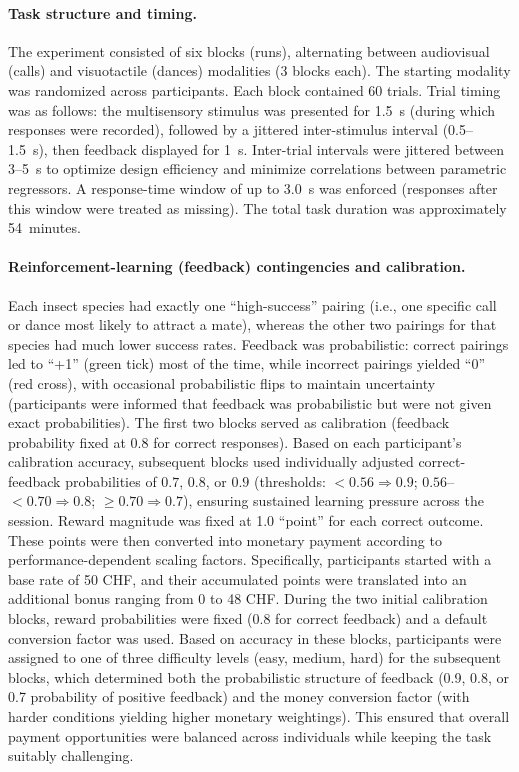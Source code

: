 \documentclass{article}
\begin{document}
\paragraph{Task structure and timing.}
The experiment consisted of six blocks (runs), alternating between audiovisual (calls) and visuotactile (dances) modalities (3 blocks each). The starting modality was randomized across participants. Each block contained 60 trials. Trial timing was as follows: the multisensory stimulus was presented for 1.5~s (during which responses were recorded), followed by a jittered inter-stimulus interval (0.5–1.5~s), then feedback displayed for 1~s. Inter-trial intervals were jittered between 3–5~s to optimize design efficiency and minimize correlations between parametric regressors. A response-time window of up to 3.0~s was enforced (responses after this window were treated as missing). The total task duration was approximately 54~minutes.

\paragraph{Reinforcement-learning (feedback) contingencies and calibration.}
Each insect species had exactly one “high-success” pairing (i.e., one specific call or dance most likely to attract a mate), whereas the other two pairings for that species had much lower success rates. Feedback was probabilistic: correct pairings led to “+1” (green tick) most of the time, while incorrect pairings yielded “0” (red cross), with occasional probabilistic flips to maintain uncertainty (participants were informed that feedback was probabilistic but were not given exact probabilities). The first two blocks served as calibration (feedback probability fixed at $0.8$ for correct responses). Based on each participant’s calibration accuracy, subsequent blocks used individually adjusted correct-feedback probabilities of $0.7$, $0.8$, or $0.9$ (thresholds: $<0.56 \Rightarrow 0.9$; $0.56$–$<0.70 \Rightarrow 0.8$; $\geq 0.70 \Rightarrow 0.7$), ensuring sustained learning pressure across the session. Reward magnitude was fixed at 1.0 “point” for each correct outcome. These points were then converted into monetary payment according to performance-dependent scaling factors. Specifically, participants started with a base rate of 50 CHF, and their accumulated points were translated into an additional bonus ranging from 0 to 48 CHF. During the two initial calibration blocks, reward probabilities were fixed (0.8 for correct feedback) and a default conversion factor was used. Based on accuracy in these blocks, participants were assigned to one of three difficulty levels (easy, medium, hard) for the subsequent blocks, which determined both the probabilistic structure of feedback (0.9, 0.8, or 0.7 probability of positive feedback) and the money conversion factor (with harder conditions yielding higher monetary weightings). This ensured that overall payment opportunities were balanced across individuals while keeping the task suitably challenging.
\end{document}
